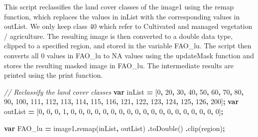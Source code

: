 \documentclass[
  10pt,
  b5paper,
  oneside]{book}
\newenvironment{Shaded}{\begin{snugshade}}{\end{snugshade}}
\newcommand{\CommentTok}[1]{\textcolor[rgb]{0.56,0.35,0.01}{\textit{#1}}}
\newcommand{\DecValTok}[1]{\textcolor[rgb]{0.00,0.00,0.81}{#1}}
\newcommand{\FunctionTok}[1]{\textcolor[rgb]{0.00,0.00,0.00}{#1}}
\newcommand{\KeywordTok}[1]{\textcolor[rgb]{0.13,0.29,0.53}{\textbf{#1}}}
\newcommand{\NormalTok}[1]{#1}
\newcommand{\OperatorTok}[1]{\textcolor[rgb]{0.81,0.36,0.00}{\textbf{#1}}}
\begin{document}
This script reclassifies the land cover classes of the image1 using the remap function, which replaces the values in inList with the corresponding values in outList. We only keep class 40 which refer to Cultivated and managed vegetation / agriculture. The resulting image is then converted to a double data type, clipped to a specified region, and stored in the variable FAO\_lu. The script then converts all 0 values in FAO\_lu to NA values using the updateMask function and stores the resulting masked image in FAO\_lu. The intermediate results are printed using the print function.

\begin{Shaded}
\begin{Highlighting}[]
\CommentTok{// Reclassify the land cover classes}
\KeywordTok{var}\NormalTok{ inList }\OperatorTok{=}\NormalTok{ [}\DecValTok{0}\OperatorTok{,} \DecValTok{20}\OperatorTok{,} \DecValTok{30}\OperatorTok{,} \DecValTok{40}\OperatorTok{,} \DecValTok{50}\OperatorTok{,} \DecValTok{60}\OperatorTok{,} \DecValTok{70}\OperatorTok{,} \DecValTok{80}\OperatorTok{,} \DecValTok{90}\OperatorTok{,} \DecValTok{100}\OperatorTok{,} \DecValTok{111}\OperatorTok{,} \DecValTok{112}\OperatorTok{,} \DecValTok{113}\OperatorTok{,} \DecValTok{114}\OperatorTok{,} \DecValTok{115}\OperatorTok{,} \DecValTok{116}\OperatorTok{,} 
              \DecValTok{121}\OperatorTok{,} \DecValTok{122}\OperatorTok{,} \DecValTok{123}\OperatorTok{,} \DecValTok{124}\OperatorTok{,} \DecValTok{125}\OperatorTok{,} \DecValTok{126}\OperatorTok{,} \DecValTok{200}\NormalTok{]}\OperatorTok{;}
\KeywordTok{var}\NormalTok{ outList }\OperatorTok{=}\NormalTok{ [}\DecValTok{0}\OperatorTok{,} \DecValTok{0}\OperatorTok{,} \DecValTok{0}\OperatorTok{,} \DecValTok{1}\OperatorTok{,} \DecValTok{0}\OperatorTok{,} \DecValTok{0}\OperatorTok{,} \DecValTok{0}\OperatorTok{,} \DecValTok{0}\OperatorTok{,} \DecValTok{0}\OperatorTok{,} \DecValTok{0}\OperatorTok{,} \DecValTok{0}\OperatorTok{,} \DecValTok{0}\OperatorTok{,} \DecValTok{0}\OperatorTok{,} \DecValTok{0}\OperatorTok{,} \DecValTok{0}\OperatorTok{,} \DecValTok{0}\OperatorTok{,} \DecValTok{0}\OperatorTok{,} \DecValTok{0}\OperatorTok{,} \DecValTok{0}\OperatorTok{,} \DecValTok{0}\OperatorTok{,} \DecValTok{0}\OperatorTok{,} \DecValTok{0}\OperatorTok{,} \DecValTok{0}\NormalTok{]}\OperatorTok{;}

\KeywordTok{var}\NormalTok{ FAO\_lu }\OperatorTok{=}\NormalTok{ image1}\OperatorTok{.}\FunctionTok{remap}\NormalTok{(inList}\OperatorTok{,}\NormalTok{ outList)}
  \OperatorTok{.}\FunctionTok{toDouble}\NormalTok{()}
  \OperatorTok{.}\FunctionTok{clip}\NormalTok{(region)}\OperatorTok{;}


\end{Highlighting}
\end{Shaded}
\end{document}
